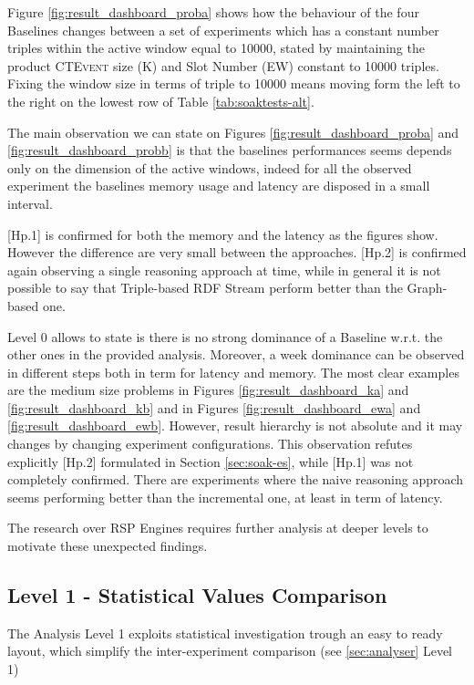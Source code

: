 Figure \ref{fig:result_dashboard_proba}  shows how the behaviour of the four Baselines changes between a set of experiments which has a constant number triples within the active window equal to 10000, stated by maintaining the product \textsc{CTEvent} size (K) and Slot Number (EW) constant to 10000 triples. Fixing the window size in terms of triple to 10000 means moving form the left to the right on the lowest row of Table \ref{tab:soaktests-alt}. 

The main observation we can state on Figures \ref{fig:result_dashboard_proba} and \ref{fig:result_dashboard_probb}  is that the baselines performances seems depends only on the dimension of the active windows, indeed for all the observed experiment the baselines memory usage and latency are disposed in a small interval.

[Hp.1] is confirmed for both the memory and the latency as the figures show. However the difference are very small between the approaches. [Hp.2] is confirmed again observing a single reasoning approach at time, while in general it is not possible to say that Triple-based RDF Stream perform better than the Graph-based one.

Level 0 allows to state is there is no strong dominance of a Baseline w.r.t. the other ones in the provided analysis. Moreover, a week dominance can be observed in different steps both in term for latency  and memory. The most clear examples are the medium size problems in Figures \ref{fig:result_dashboard_ka} and \ref{fig:result_dashboard_kb} and in Figures \ref{fig:result_dashboard_ewa} and \ref{fig:result_dashboard_ewb}. However, result hierarchy is not absolute and it may changes by changing experiment configurations. This observation refutes explicitly [Hp.2] formulated in Section \ref{sec:soak-es}, while [Hp.1] was not completely confirmed. There are experiments where the naive  reasoning  approach seems performing better than the incremental one, at least in term of latency. 

The research over RSP Engines requires further analysis at deeper levels to motivate these unexpected findings.

\subsection{Level 1 -  Statistical Values Comparison}\label{sec:eval-level1}



The Analysis Level 1 exploits statistical investigation trough an easy to ready layout, which simplify the inter-experiment comparison (see \ref{sec:analyser} Level 1)

